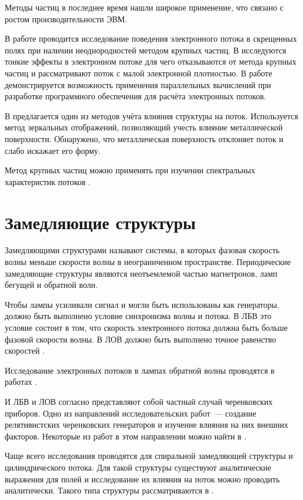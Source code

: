 \documentclass[a4paper,14pt]{extreport} %
\begin{document}
Методы частиц в последнее время нашли широкое применение, что связано с ростом производительности ЭВМ. 

В работе \cite{VSTUShein1} проводится исследование поведения электронного потока в скрещенных полях при наличии неоднородностей методом крупных частиц. В \cite{VSTUShein4} исследуются тонкие эффекты в электронном потоке для чего отказываются от метода крупных частиц и рассматривают поток с малой электронной плотностью. В работе \cite{VSTUSham} демонстрируется возможность применения параллельных вычислений при разработке программного обеспечения для расчёта электронных потоков. 

В \cite{VSTUShein2} предлагается один из методов учёта влияния структуры на поток. Используется метод зеркальных отображений, позволяющий учесть влияние металлической поверхности. Обнаружено, что металлическая поверхность отклоняет поток и слабо искажает его форму.

Метод крупных частиц можно применять при изучении спектральных характеристик потоков \cite{VSTUErm}. 


\section{Замедляющие структуры}

Замедляющими структурами называют системы, в которых фазовая скорость волны меньше скорости волны в неограниченном пространстве. Периодические замедляющие структуры являются неотъемлемой частью магнетронов, ламп бегущей и обратной волн. 

Чтобы лампы усиливали сигнал и могли быть использованы как генераторы, должно быть выполнено условие синхронизма волны и потока. В ЛБВ это условие состоит в том, что скорость электронного потока должна быть больше фазовой скорости волны. В ЛОВ должно быть выполнено точное равенство скоростей \cite{Chramov}.

Исследование электронных потоков в лампах обратной волны проводятся в работах \cite{UFNGinzburg,GTFKorovin,GTFRostov}. 

И ЛБВ и ЛОВ согласно \cite{Polevin} представляют собой частный случай черенковских приборов. Одно из направлений исследовательских работ~--- создание релятивистских черенковских генераторов и изучение влияния на них внешних факторов. Некоторые из работ в этом направлении можно найти в \cite{GTFKlimov,VGTNifanov,UFNGuliaev}.

Чаще всего исследования проводятся для спиральной замедляющей структуры и цилиндрического потока. Для такой структуры существуют аналитические выражения для полей и исследование их влияния на поток можно проводить аналитически. Такого типа структуры рассматриваются в \cite{Schachter,Polevin}.
\end{document}
